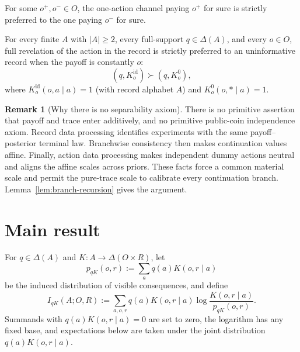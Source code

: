 \documentclass[11pt,a4paper]{article}
\theoremstyle{definition}
\newtheorem{remark}[theorem]{Remark}
\newcommand{\D}{\Delta}
\newcommand{\I}{I}
\newcommand{\1}{\mathbf 1}
\begin{document}
\begin{description}[leftmargin=*,style=sameline]
\item[(A7) Material relevance.]
For some $o^+,o^-\in O$, the one-action channel paying $o^+$ for sure is strictly preferred to the one paying $o^-$
for sure.

\item[(A8) Positive trace orientation.]
For every finite $A$ with $|A|\ge2$, every full-support $q\in\D(A)$, and every $o\in O$, full revelation of the
action in the record is strictly preferred to an uninformative record when the payoff is constantly $o$:
\[
 (q,K^{\mathrm{id}}_o)\succ(q,K^0_o),
\]
where $K^{\mathrm{id}}_o(o,a\mid a)=1$ (with record alphabet $A$) and
$K^0_o(o,\ast\mid a)=1$.

\end{description}

\begin{remark}[Why there is no separability axiom]\label{rem:no-sep}
There is no primitive assertion that payoff and trace enter additively, and no primitive public-coin independence
axiom.  Record data processing identifies experiments with the same payoff--posterior terminal law.  Branchwise
consistency then makes continuation values affine.  Finally, action data processing makes independent dummy actions
neutral and aligns the affine scales across priors.  These facts force a common material scale and permit the
pure-trace scale to calibrate every continuation branch.  Lemma~\ref{lem:branch-recursion} gives the argument.
\end{remark}

\section{Main result}

For $q\in\D(A)$ and $K:A\to\D(O\times R)$, let
\[
 p_{qK}(o,r):=\sum_a q(a)K(o,r\mid a)
\]
be the induced distribution of visible consequences, and define
\begin{equation}
 \I_{qK}(A;O,R)
 :=\sum_{a,o,r}q(a)K(o,r\mid a)
 \log\frac{K(o,r\mid a)}{p_{qK}(o,r)}.
 \label{eq:mi}
\end{equation}
Summands with $q(a)K(o,r\mid a)=0$ are set to zero, the logarithm has any fixed base, and expectations below are
taken under the joint distribution $q(a)K(o,r\mid a)$.
\end{document}
